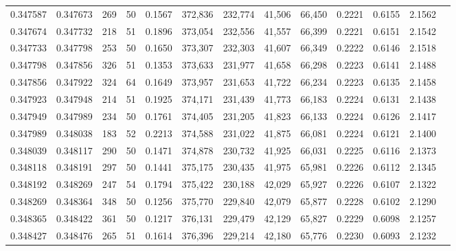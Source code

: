 \begin{tabular}{rrrrrrrrrrrrr}
0.347587 & 0.347673 &   269 &  50 &                                     0.1567 & 372,836 & 232,774 &  41,506 &  66,450 & 0.2221 & 0.6155 & 2.1562 \\
0.347674 & 0.347732 &   218 &  51 &                                     0.1896 & 373,054 & 232,556 &  41,557 &  66,399 & 0.2221 & 0.6151 & 2.1542 \\
0.347733 & 0.347798 &   253 &  50 &                                     0.1650 & 373,307 & 232,303 &  41,607 &  66,349 & 0.2222 & 0.6146 & 2.1518 \\
0.347798 & 0.347856 &   326 &  51 &                                     0.1353 & 373,633 & 231,977 &  41,658 &  66,298 & 0.2223 & 0.6141 & 2.1488 \\
0.347856 & 0.347922 &   324 &  64 &                                     0.1649 & 373,957 & 231,653 &  41,722 &  66,234 & 0.2223 & 0.6135 & 2.1458 \\
0.347923 & 0.347948 &   214 &  51 &                                     0.1925 & 374,171 & 231,439 &  41,773 &  66,183 & 0.2224 & 0.6131 & 2.1438 \\
0.347949 & 0.347989 &   234 &  50 &                                     0.1761 & 374,405 & 231,205 &  41,823 &  66,133 & 0.2224 & 0.6126 & 2.1417 \\
0.347989 & 0.348038 &   183 &  52 &                                     0.2213 & 374,588 & 231,022 &  41,875 &  66,081 & 0.2224 & 0.6121 & 2.1400 \\
0.348039 & 0.348117 &   290 &  50 &                                     0.1471 & 374,878 & 230,732 &  41,925 &  66,031 & 0.2225 & 0.6116 & 2.1373 \\
0.348118 & 0.348191 &   297 &  50 &                                     0.1441 & 375,175 & 230,435 &  41,975 &  65,981 & 0.2226 & 0.6112 & 2.1345 \\
0.348192 & 0.348269 &   247 &  54 &                                     0.1794 & 375,422 & 230,188 &  42,029 &  65,927 & 0.2226 & 0.6107 & 2.1322 \\
0.348269 & 0.348364 &   348 &  50 &                                     0.1256 & 375,770 & 229,840 &  42,079 &  65,877 & 0.2228 & 0.6102 & 2.1290 \\
0.348365 & 0.348422 &   361 &  50 &                                     0.1217 & 376,131 & 229,479 &  42,129 &  65,827 & 0.2229 & 0.6098 & 2.1257 \\
0.348427 & 0.348476 &   265 &  51 &                                     0.1614 & 376,396 & 229,214 &  42,180 &  65,776 & 0.2230 & 0.6093 & 2.1232 \\

\end{tabular}
